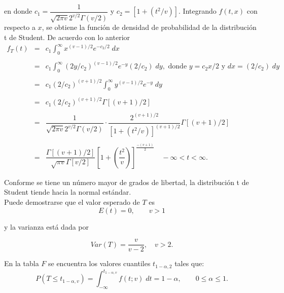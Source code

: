 \begin{teo}
	en donde $c_1=\dfrac{1}{\sqrt{2\pi v}2^{v/2}\Gamma(v/2)}$ y $c_2=\left[1+\left(t^2/v\right)\right]$. Integrando $f(t,x)$ con respecto a $x$, se obtiene la función de densidad de probabilidad de la distribución t de Student. De acuerdo con lo anterior
	$$
	\begin{array}{rcl}
	f_T(t)&=&c_1\displaystyle\int_0^\infty x^{(v-1)/2} e^{-c_2/2}\; dx\\\\
	&=& c_1 \displaystyle\int_0^\infty (2y/c_2)^{(v-1)/2}e^{-y}(2/c_2)\; dy, \mbox{ donde } y=c_2x/2 \mbox{ y } dx=(2/c_2)\; dy\\\\
	&=& c_1(2/c_2)^{(v+1)/2} \displaystyle\int_0^\infty y^{(v-1)/2}e^{-y}\; dy\\\\
	&=& c_1(2/c_2)^{(v+1)/2} \Gamma\left[(v+1)/2\right]\\\\
	&=& \dfrac{1}{\sqrt{2\pi v}2^{v/2}\Gamma(v/2)}\cdot \dfrac{2^{(v+1)/2}}{\left[1+(t^2/v)\right]^{(v+1)/2}}\Gamma\left[(v+1)/2\right]\\\\
	&=& \dfrac{\Gamma\left[(v+1)/2\right]}{\sqrt{\pi v}\Gamma\left[v/2\right]}\left[1+\left(\dfrac{t^2}{v}\right)\right]^{\frac{-(v+1)}{2}} \quad -\infty<t<\infty.
	\end{array}
	$$

\end{teo}

Conforme se tiene un número mayor de grados de libertad, la distribución t de Student tiende hacia la normal estándar. \\

Puede demostrarse que el valor esperado de $T$ es
$$E(t)=0,\qquad v>1$$

y la varianza está dada por

$$Var(T)=\dfrac{v}{v-2},\quad v>2.$$

En la tabla $F$ se encuentra los valores cuantiles $t_{1-\alpha,2}$ tales que:
$$P(T\leq t_{1-\alpha,v})=\int_{-\infty}^{t_{1-\alpha,v}}f(t;v)\; dt = 1-\alpha,\qquad 0\leq \alpha\leq 1.$$


